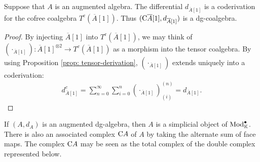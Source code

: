 \documentclass[../thesis.tex]{subfiles}
\begin{document}
            \begin{proposition}\label{prop: a-to-dgc}
                Suppose that $A$ is an augmented algebra. The differential $d_{\overline{A}[1]}$ is a coderivation for the cofree coalgebra $T^c(\overline{A}[1])$. Thus $(\tt{C}\overline{A}[1], d_{\overline{A}[1]})$ is a dg-coalgebra.
            \end{proposition}

            \begin{proof}
                By injecting $\overline{A}[1]$ into $T^c(\overline{A}[1])$, we may think of $(\cdot_{\overline{A}[1]}) : \overline{A}[1]^{\otimes 2} \rightarrow T^c(\overline{A}[1])$ as a morphism into the tensor coalgebra. By using Proposition \ref{prop: tensor-derivation}, $(\cdot_{\overline{A}[1]})$ extends uniquely into a coderivation:
                \begin{align*}
                    d_{\overline{A}[1]}^c = \sum_{n=0}^{\infty}\sum_{i=0}^n(\cdot_{\overline{A}[1]})_{(i)}^{(n)} = d_{\overline{A}[1]}\text{.}
                \end{align*}
            \end{proof}

            If $(A, d_A)$ is an augmented dg-algebra, then $A$ is a simplicial object of $\tt{Mod}_\mathbb{K}^\bullet$. There is also an associated complex $\tt{C}A$ of $A$ by taking the alternate sum of face maps. The complex $\tt{C}A$ may be seen as the total complex of the double complex represented below. 
            \begin{center}
            \end{center}
        
\end{document}
